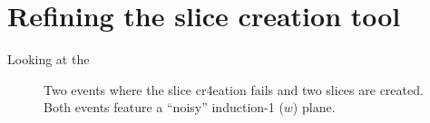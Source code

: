 
\section{Refining the slice creation tool}

Looking at the 


\begin{figure}
    \centering
    
    \caption[Examples of issues with the slice creation]{Two events where the slice cr4eation fails and two slices are created. Both events feature a ``noisy'' induction-1 ($w$) plane. }
    \label{fig:sliceIssue}
\end{figure}
